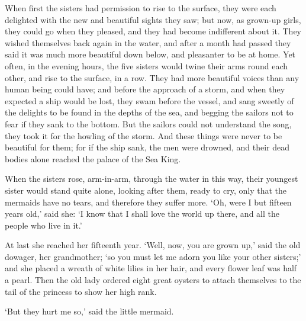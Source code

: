 When first the sisters had permission to rise to the surface, they
were each delighted with the new and beautiful sights they saw; but
now, as grown-up girls, they could go when they pleased, and they
had become indifferent about it. 
They wished themselves back again
in the water, and after a month had passed they said it was much
more beautiful down below, and pleasanter to be at home. 
Yet often, in
the evening hours, the five sisters would twine their arms round
each other, and rise to the surface, in a row. 
They had more beautiful
voices than any human being could have; and before the approach of a
storm, and when they expected a ship would be lost, they swam before
the vessel, and sang sweetly of the delights to be found in the depths
of the sea, and begging the sailors not to fear if they sank to the
bottom. 
But the sailors could not understand the song, they took it
for the howling of the storm. 
And these things were never to be
beautiful for them; for if the ship sank, the men were drowned, and
their dead bodies alone reached the palace of the Sea King.

When the sisters rose, arm-in-arm, through the water in this
way, their youngest sister would stand quite alone, looking after
them, ready to cry, only that the mermaids have no tears, and
therefore they suffer more. 
`Oh, were I but fifteen years old,' said
she: `I know that I shall love the world up there, and all the
people who live in it.'

At last she reached her fifteenth year. 
`Well, now, you are
grown up,' said the old dowager, her grandmother; `so you must let
me adorn you like your other sisters;' and she placed a wreath of
white lilies in her hair, and every flower leaf was half a pearl. 
Then
the old lady ordered eight great oysters to attach themselves to the
tail of the princess to show her high rank.

`But they hurt me so,' said the little mermaid.

